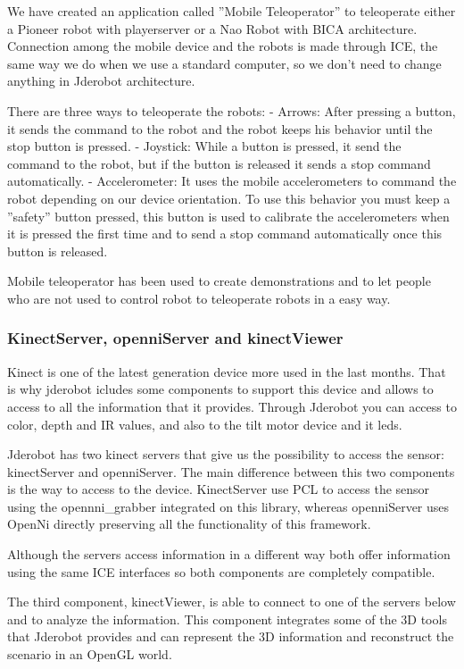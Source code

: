 \documentclass[twocolumn]{svjour3}          %
\begin{document}
We have created an application called ''Mobile Teleoperator'' to teleoperate either a Pioneer robot with playerserver or a Nao Robot with BICA architecture. Connection among the mobile device and the robots is made through ICE, the same way we do when we use a standard computer, so we don't need to change anything in Jderobot architecture.

There are three ways to teleoperate the robots:
- Arrows: After pressing a button, it sends the command to the robot and the robot keeps his behavior until the stop button is pressed.
- Joystick: While a button is pressed, it send the command to the robot, but if the button is released it sends a stop command automatically.
- Accelerometer: It uses the mobile accelerometers to command the robot depending on our device orientation. To use this behavior you must keep a ''safety'' button pressed, this button is used to calibrate the accelerometers when it is pressed the first time and to send a stop command automatically once this button is released.

Mobile teleoperator has been used to create demonstrations and to let people who are not used to control robot to teleoperate robots in a easy way.


\subsubsection{KinectServer, openniServer and kinectViewer}
Kinect is one of the latest generation device more used in the last months. That is why jderobot icludes some components to support this device and allows to access to all the information that it provides. Through Jderobot you can access to color, depth and IR values, and also to the tilt motor device and it leds.

Jderobot has two kinect servers that give us the possibility to access the sensor: kinectServer and openniServer. The main difference between this two components is the way to access to the device. KinectServer use PCL to access the sensor using the opennni\_grabber integrated on this library, whereas openniServer uses OpenNi directly preserving all the functionality of this framework. 

Although the servers access information in a different way both offer information using the same ICE interfaces so both components are completely compatible. 

The third component, kinectViewer, is able to connect to one of the servers below and to analyze  the information. This component integrates some of the 3D tools that Jderobot provides and can represent the 3D information and reconstruct the scenario in an OpenGL world. 
\end{document}
